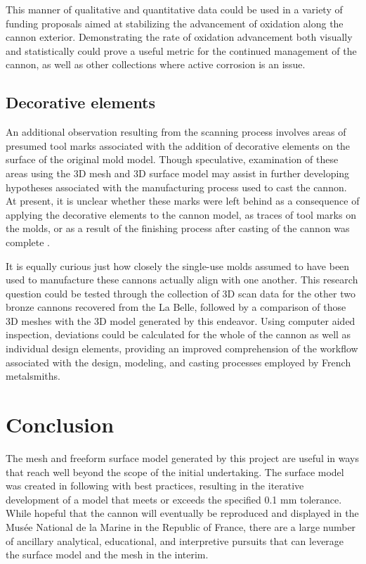 \documentclass[review]{elsarticle}
\begin{document}
This manner of qualitative and quantitative data could be used in a variety of funding proposals aimed at stabilizing the advancement of oxidation along the cannon exterior. Demonstrating the rate of oxidation advancement both visually and statistically could prove a useful metric for the continued management of the cannon, as well as other collections where active corrosion is an issue. 

\subsection*{Decorative elements}

An additional observation resulting from the scanning process involves areas of presumed tool marks associated with the addition of decorative elements on the surface of the original mold model. Though speculative, examination of these areas using the 3D mesh and 3D surface model may assist in further developing hypotheses associated with the manufacturing process used to cast the cannon. At present, it is unclear whether these marks were left behind as a consequence of applying the decorative elements to the cannon model, as traces of tool marks on the molds, or as a result of the finishing process after casting of the cannon was complete \cite[358]{RN5763}.

It is equally curious just how closely the single-use molds assumed to have been used to manufacture these cannons actually align with one another. This research question could be tested through the collection of 3D scan data for the other two bronze cannons recovered from the La Belle, followed by a comparison of those 3D meshes with the 3D model generated by this endeavor. Using computer aided inspection, deviations could be calculated for the whole of the cannon as well as individual design elements, providing an improved comprehension of the workflow associated with the design, modeling, and casting processes employed by French metalsmiths.

\section*{Conclusion}

The mesh and freeform surface model generated by this project are useful in ways that reach well beyond the scope of the initial undertaking. The surface model was created in following with best practices, resulting in the iterative development of a model that meets or exceeds the specified 0.1 mm tolerance. While hopeful that the cannon will eventually be reproduced and displayed in the Musée National de la Marine in the Republic of France, there are a large number of ancillary analytical, educational, and interpretive pursuits that can leverage the surface model and the mesh in the interim.
\end{document}
